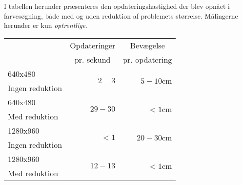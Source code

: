 I tabellen herunder præsenteres den opdateringshastighed der blev opnået i farvesøgning, både med og uden reduktion af problemets størrelse.
Målingerne herunder er kun \emph{optrentlige}.

{
\newcommand{\mr}[1]{\multirow{2}{*}{#1}}
\newcommand{\ce}[1]{\multicolumn{1}{c|}{#1}}

\begin{center}
\begin{tabular}{| l | r | r |}
\hline
& \ce{Opdateringer} & \ce{Bevægelse}\\
& \ce{pr. sekund} & \ce{pr. opdatering}\\\hline
640x480&\mr{$2-3$}&\mr{$5-10$cm}\\
Ingen reduktion&&\\\hline
640x480&\mr{$29-30$}&\mr{$<1$cm}\\
Med reduktion&&\\\hline
1280x960&\mr{$<1$}&\mr{$20-30$cm}\\
Ingen reduktion&&\\\hline
1280x960&\mr{$12-13$}&\mr{$<1$cm}\\
Med reduktion&&\\\hline
\end{tabular}
\end{center}}
%
%
%
%
%
%
%